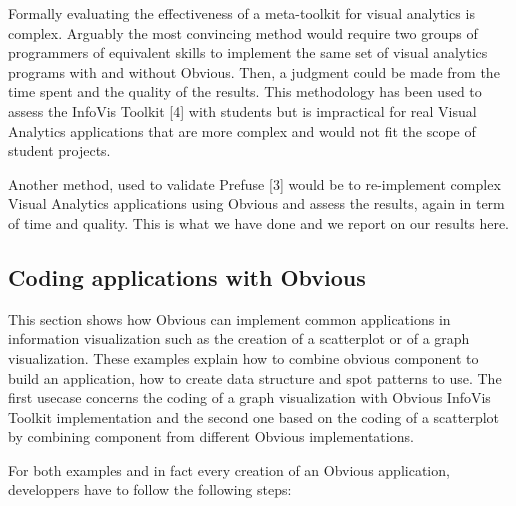 Formally evaluating the effectiveness of a meta-toolkit for visual analytics is complex. Arguably the most convincing method would require two groups of programmers of equivalent skills to implement the same set of visual analytics programs with and without Obvious. Then, a judgment could be made from the time spent and the quality of the results. This methodology has been used to assess the InfoVis Toolkit [4] with students but is impractical for real Visual Analytics applications that are more complex and would not fit the scope of student projects.

Another method, used to validate Prefuse [3] would be to re-implement complex Visual Analytics applications using Obvious and assess the results, again in term of time and quality. This is what we have done and we report on our results here.

\subsection{Coding applications with Obvious}

This section shows how Obvious can implement common applications in information visualization such as the creation of a scatterplot or of a graph visualization. These examples explain how to combine obvious component to build an application, how to create data structure and spot patterns to use. The first usecase concerns the coding of a graph visualization with Obvious InfoVis Toolkit implementation and the second one based on the coding of a scatterplot by combining component from different Obvious implementations.

For both examples and in fact every creation of an Obvious application, developpers have to follow the following steps:

